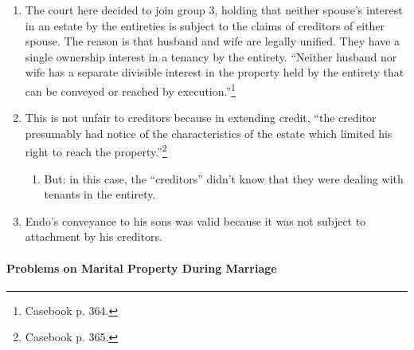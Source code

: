\begin{enumerate}
\begin{enumerate}
        control. In these states, the MWPA did not apply to tenancy by the 
        entirety. (These states have all since changed their approach.)
        \item \emph{Group 2}: the MWPA was meant to make the wife's rights 
        equal to her husband's. Therefore, the interest of the debtor spouse 
        can be conveyed, subject to the other spouse's contingent right of 
        survivorship. (There are other possible gender neutral 
        solutions---e.g., groups 3 and 4, below).
        \item \emph{Group 3}: the MWPA means that the estate is not subject to 
        the debts of either spouse. An attempted conveyance by either spouse 
        is void.
        \item \emph{Group 4}: the MWPA means that each spouse's right of 
        survivorship is alienable and attachable by creditors.
    \end{enumerate}
    \item The court here decided to join group 3, holding that neither 
    spouse's interest in an estate by the entireties is subject to the claims 
    of creditors of either spouse. The reason is that husband and wife are 
    legally unified. They have a single ownership interest in a tenancy by the 
    entirety. ``Neither husband nor wife has a separate divisible interest in 
    the property held by the entirety that can be conveyed or reached by 
    execution.''\footnote{Casebook p. 364.}
    \item This is not unfair to creditors because in extending credit, ``the 
    creditor presumably had notice of the characteristics of the estate which 
    limited his right to reach the property.''\footnote{Casebook p. 365.}
    \begin{enumerate}
        \item But: in this case, the ``creditors'' didn't know that they were 
        dealing with tenants in the entirety.
    \end{enumerate}
    \item Endo's conveyance to his sons was valid because it was not subject 
    to attachment by his creditors.
\end{enumerate}

\paragraph{Problems on Marital Property During Marriage}


